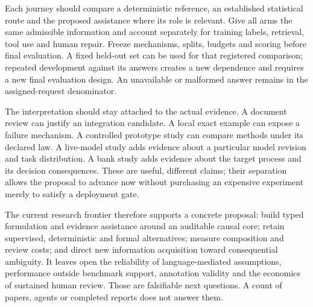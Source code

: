 Each journey should compare a deterministic reference, an established
statistical route and the proposed assistance where its role is relevant.
Give all arms the same admissible information and account separately for
training labels, retrieval, tool use and human repair. Freeze mechanisms,
splits, budgets and scoring before final evaluation. A fixed held-out set can
be used for that registered comparison; repeated development against its
answers creates a new dependence and requires a new final evaluation design.
An unavailable or malformed answer remains in the assigned-request denominator.

The interpretation should stay attached to the actual evidence. A document
review can justify an integration candidate. A local exact example can expose
a failure mechanism. A controlled prototype study can compare methods under
its declared law. A live-model study adds evidence about a particular model
revision and task distribution. A bank study adds evidence about the target
process and its decision consequences. These are useful, different claims;
their separation allows the proposal to advance now without purchasing an
expensive experiment merely to satisfy a deployment gate.

The current research frontier therefore supports a concrete proposal: build
typed formulation and evidence assistance around an auditable causal core;
retain supervised, deterministic and formal alternatives; measure composition
and review costs; and direct new information acquisition toward consequential
ambiguity. It leaves open the reliability of language-mediated assumptions,
performance outside benchmark support, annotation validity and the economics
of sustained human review. Those are falsifiable next questions. A count of
papers, agents or completed reports does not answer them.
\label{exec13:frontier-synthesis-end}
